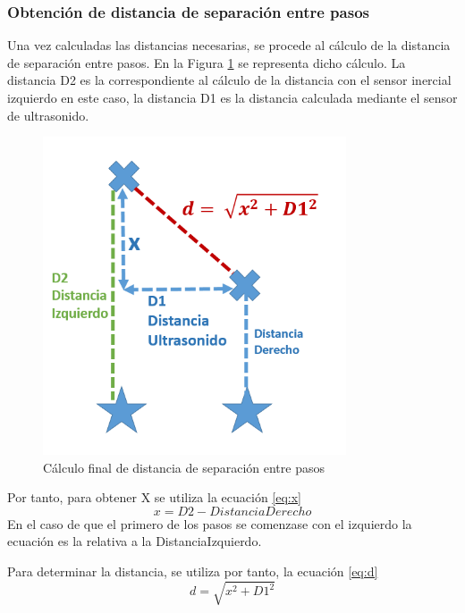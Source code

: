 		
\subsubsection{Obtención de distancia de separación entre pasos}

Una vez calculadas las distancias necesarias, se procede al cálculo de la distancia de separación entre pasos. En la Figura \ref{fig:sep} se representa dicho cálculo. La distancia D2 es la correspondiente al cálculo de la distancia con el sensor inercial izquierdo en este caso, la distancia D1 es la distancia calculada mediante el sensor de ultrasonido.
\begin{figure}[H]
	\centering
	\includegraphics[width=0.8\textwidth]{./graphics/sep}
	\caption{Cálculo final de distancia de separación entre pasos} \label{fig:sep}
\end{figure}

Por tanto, para obtener X se utiliza la ecuación \ref{eq:x}
\begin{equation}\label{eq:x}
x = D2 - DistanciaDerecho
\end{equation}
En el caso de que el primero de los pasos se comenzase con el izquierdo la ecuación es la relativa a la DistanciaIzquierdo.

Para determinar la distancia, se utiliza por tanto, la ecuación \ref{eq:d}
\begin{equation}\label{eq:d}
d = \sqrt{x^{2}+D1^{2}}
\end{equation}